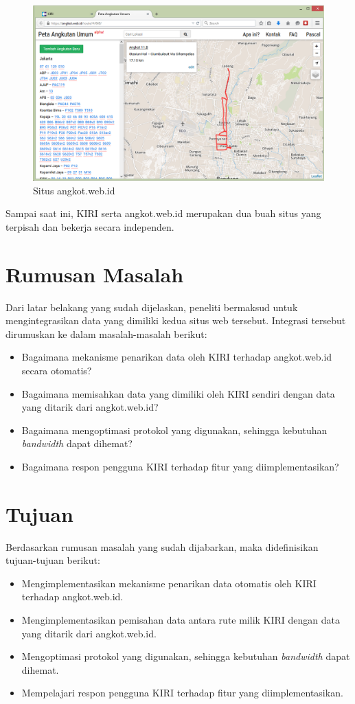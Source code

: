 \begin{figure}
	\centering
	\includegraphics[scale=0.5]{Gambar/1_angkotwebid}
	\caption{Situs angkot.web.id}
	\label{fig:1_angkotwebid}
\end{figure}

Sampai saat ini, KIRI serta angkot.web.id merupakan dua buah situs yang terpisah dan bekerja secara independen.

\section{Rumusan Masalah}
\label{sec:rumusan_masalah}
Dari latar belakang yang sudah dijelaskan, peneliti bermaksud untuk mengintegrasikan data yang dimiliki kedua situs web tersebut. Integrasi tersebut dirumuskan ke dalam masalah-masalah berikut:
\begin{itemize}
	\item Bagaimana mekanisme penarikan data oleh KIRI terhadap angkot.web.id secara otomatis?
	\item Bagaimana memisahkan data yang dimiliki oleh KIRI sendiri dengan data yang ditarik dari angkot.web.id?
	\item Bagaimana mengoptimasi protokol yang digunakan, sehingga kebutuhan \textit{bandwidth} dapat dihemat?
	\item Bagaimana respon pengguna KIRI terhadap fitur yang diimplementasikan?
\end{itemize}

\section{Tujuan}
\label{sec:tujuan}
Berdasarkan rumusan masalah yang sudah dijabarkan, maka didefinisikan tujuan-tujuan berikut:
\begin{itemize}
	\item Mengimplementasikan mekanisme penarikan data otomatis oleh KIRI terhadap angkot.web.id.
	\item Mengimplementasikan pemisahan data antara rute milik KIRI dengan data yang ditarik dari angkot.web.id.
	\item Mengoptimasi protokol yang digunakan, sehingga kebutuhan \textit{bandwidth} dapat dihemat.
	\item Mempelajari respon pengguna KIRI terhadap fitur yang diimplementasikan.
\end{itemize}

